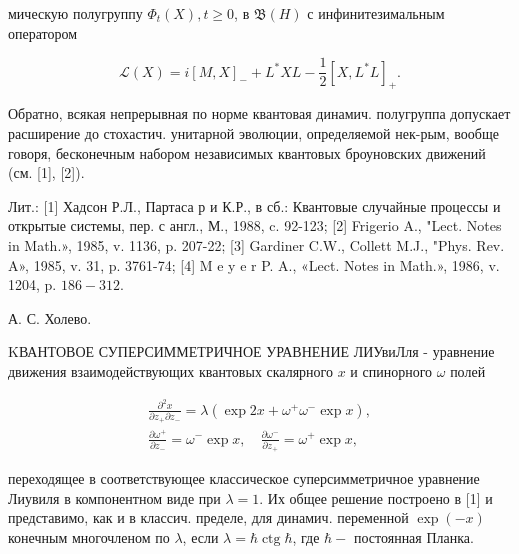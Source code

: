 \documentclass[10pt]{article}
\begin{document}
мическую полугруппу $\Phi_{t}(X), t \geqslant 0$, в $\mathfrak{B}(H)$ с инфинитезимальным оператором



\[

\mathscr{L}(X)=i[M, X]_{-}+L^{*} X L-\frac{1}{2}\left[X, L^{*} L\right]_{+} .

\]



Обратно, всякая непрерывная по норме квантовая динамич. полугруппа допускает расширение до стохастич. унитарной эволюции, определяемой нек-рым, вообще говоря, бесконечным набором независимых квантовых броуновских движений (см. [1], [2]).



Лит.: [1] Хадсон Р.Л., Партаса р и К.Р., в сб.: Квантовые случайные процессы и открытые системы, пер. с англ., М., 1988, c. 92-123; [2] Frigerio A., "Lect. Notes in Math.», 1985, v. 1136, p. 207-22; [3] Gardiner C.W., Collett M.J., "Phys. Rev. A», 1985, v. 31, p. 3761-74; [4] M e y e r P. A., «Lect. Notes in Math.», 1986, v. 1204, p. $186-312$.



А. С. Холево.



KВАНТОВОЕ СУПЕРСИММЕТРИЧНОЕ УРАВНЕНИЕ ЛИУвиЛля - уравнение движения взаимодействующих квантовых скалярного $x$ и спинорного $\omega$ полей



\[

\begin{gathered}

\frac{\partial^{2} x}{\partial z_{+} \partial z_{-}}=\lambda\left(\exp 2 x+\omega^{+} \omega^{-} \exp x\right), \\

\frac{\partial \omega^{+}}{\partial z_{-}}=\omega^{-} \exp x, \quad \frac{\partial \omega^{-}}{\partial z_{+}}=\omega^{+} \exp x,

\end{gathered}

\]



переходящее в соответствующее классическое суперсимметричное уравнение Лиувиля в компонентном виде при $\lambda=1$. Их общее решение построено в [1] и представимо, как и в классич. пределе, для динамич. переменной $\exp (-x)$ конечным многочленом по $\lambda$, если $\lambda=\hbar \operatorname{ctg} \hbar$, где $\hbar-$ постоянная Планка.
\end{document}
